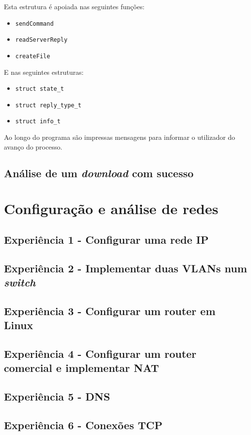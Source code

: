 \documentclass{article}
\begin{document}
Esta estrutura é apoiada nas seguintes funções:
\begin{itemize}
\item \texttt{sendCommand}
\item \texttt{readServerReply}
\item \texttt{createFile}
\end{itemize}

E nas seguintes estruturas:

\begin{itemize}
\item \texttt{struct state_t}
\item \texttt{struct reply_type_t}
\item \texttt{struct info_t}
\end{itemize}


Ao longo do programa são impressas mensagens para informar o utilizador do avanço do processo.
\subsection{Análise de um \textit{download} com sucesso}
\section{Configuração e análise de redes}
\subsection{Experiência 1 - Configurar uma rede IP}
\subsection{Experiência 2 - Implementar duas VLANs num \textit{switch}}
\subsection{Experiência 3 - Configurar um router em Linux}
\subsection{Experiência 4 - Configurar um router comercial e implementar NAT}
\subsection{Experiência 5 - DNS}
\subsection{Experiência 6 - Conexões TCP}
\end{document}
